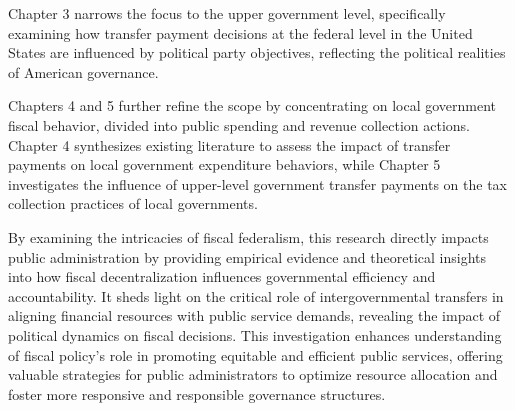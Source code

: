 Chapter 3 narrows the focus to the upper government level, specifically examining how transfer payment decisions at the federal level in the United States are influenced by political party objectives, reflecting the political realities of American governance.

Chapters 4 and 5 further refine the scope by concentrating on local government fiscal behavior, divided into public spending and revenue collection actions. Chapter 4 synthesizes existing literature to assess the impact of transfer payments on local government expenditure behaviors, while Chapter 5 investigates the influence of upper-level government transfer payments on the tax collection practices of local governments.

By examining the intricacies of fiscal federalism, this research directly impacts public administration by providing empirical evidence and theoretical insights into how fiscal decentralization influences governmental efficiency and accountability. It sheds light on the critical role of intergovernmental transfers in aligning financial resources with public service demands, revealing the impact of political dynamics on fiscal decisions. This investigation enhances understanding of fiscal policy's role in promoting equitable and efficient public services, offering valuable strategies for public administrators to optimize resource allocation and foster more responsive and responsible governance structures.
